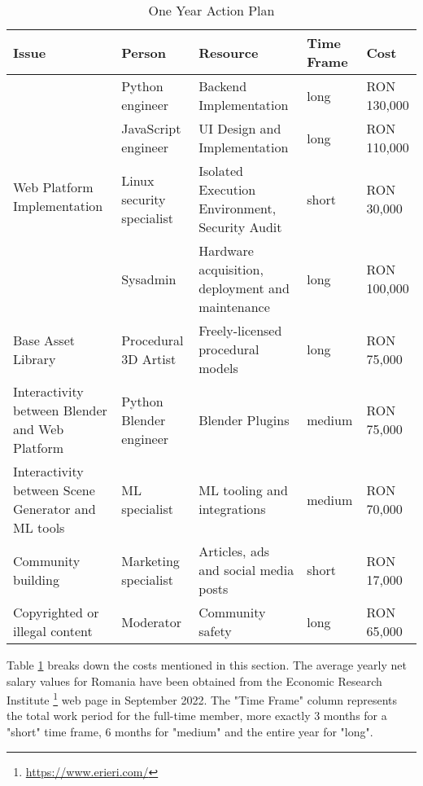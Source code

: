 \begin{table}[H]
\centering
\begin{tabular}{|p{3.6cm}|p{1.8cm}|p{3.6cm}|p{1.6cm}|p{1.6cm}|}
\hline
Issue & Person & Resource & Time Frame & Cost \\ \hline\hline
\multirow{4}{*}{\parbox[c]{2.6cm}{\centering Web Platform Implementation}} & 
Python \mbox{engineer} & 
Backend Implementation & 
long & RON 130,000 \\ \cline{2-5}

  & 
JavaScript engineer & 
UI Design and Implementation &
long & RON 110,000 \\\cline{2-5}

  & 
Linux \mbox{security} specialist &
Isolated Execution Environment, Security Audit &
short & RON 30,000 \\\cline{2-5}

 & 
Sysadmin &
Hardware acquisition, deployment and maintenance &
long & RON 100,000 \\\hline

Base Asset Library & 
Procedural 3D Artist &
Freely-licensed \mbox{procedural} models & 
long & RON 75,000 \\\hline

Interactivity between Blender and Web Platform  & 
Python Blender engineer & 
Blender Plugins & 
medium & RON 75,000 \\\hline

Interactivity between Scene Generator and ML tools &
ML  \mbox{specialist} & 
ML tooling and \mbox{integrations} & 
medium & RON 70,000 \\\hline

Community building  & 
Marketing specialist & 
Articles, ads and social media posts &
short & RON 17,000 \\\hline

Copyrighted or illegal content  & 
Moderator &
Community safety &
long &  RON 65,000  \\\hline

\end{tabular}
\caption{One Year Action Plan}
\label{fig:one-year-action-plan}
\end{table}


Table \ref{fig:one-year-action-plan} breaks down the costs mentioned in this section. The average yearly net salary values for Romania have been obtained from the Economic Research Institute \footnote{\url{https://www.erieri.com/}} web page in September 2022. The "Time Frame" column represents the total work period for the full-time member, more exactly 3 months for a "short" time frame, 6 months for "medium" and the entire year for "long".

